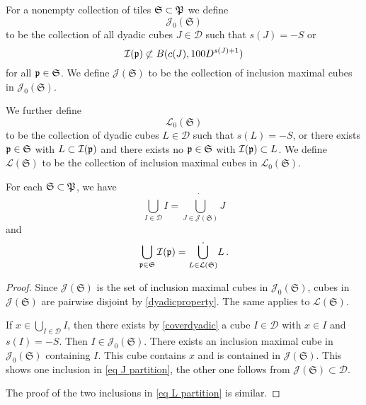 {For a nonempty collection of tiles $\mathfrak{S} \subset \mathfrak P$ we define
$$
    \mathcal{J}_0(\mathfrak{S})
$$
to be the collection of all dyadic cubes $J \in \mathcal{D}$ such that $s(J) = -S$ or
$$
    \mathcal{I}(\mathfrak p) \not\subset B(c(J), 100D^{s(J) + 1})
$$
for all $\mathfrak p \in \mathfrak{S}$. We define $\mathcal{J}(\mathfrak{S})$ to be the collection of inclusion maximal cubes in $\mathcal{J}_0(\mathfrak{S})$.

We further define
$$
    \mathcal{L}_0(\mathfrak{S})
$$
to be the collection of dyadic cubes $L \in \mathcal{D}$ such that $s(L) = -S$, or there exists $\mathfrak p \in \mathfrak{S}$ with $L \subset \mathcal{I}(\mathfrak p)$ and there exists no $\mathfrak p \in \mathfrak{S}$ with $\mathcal{I}(\mathfrak p) \subset L$. We define $\mathcal{L}(\mathfrak{S})$ to be the collection of inclusion maximal cubes in $\mathcal{L}_0(\mathfrak{S})$.

\begin{lemma}
    \label{lem partition}
    For each $\mathfrak{S} \subset \mathfrak P$, we have
    \begin{equation}
        \label{eq J partition}
        \bigcup_{I \in \mathcal{D}} I = \dot{\bigcup_{J \in \mathcal{J}(\mathfrak{S})}} J
    \end{equation}
    and
    \begin{equation}
        \label{eq L partition}
        \bigcup_{\mathfrak p\in \mathfrak{S}} \mathcal{I}(\mathfrak p) = \dot{\bigcup_{L \in \mathcal{L}(\mathfrak{S})}} L\,.
    \end{equation}
\end{lemma}

\begin{proof}
    Since $\mathcal{J}(\mathfrak{S})$ is the set of inclusion maximal cubes in $\mathcal{J}_0(\mathfrak{S})$, cubes in $\mathcal{J}(\mathfrak{S})$ are pairwise disjoint by \eqref{dyadicproperty}. The same applies to $\mathcal{L}(\mathfrak{S})$.

    If $x \in \bigcup_{I \in \mathcal{D}} I$, then there exists by \eqref{coverdyadic} a cube $I \in \mathcal{D}$ with $x \in I$ and $s(I) = -S$. Then $I \in \mathcal{J}_0(\mathfrak{S})$. There exists an inclusion maximal cube in $\mathcal{J}_0(\mathfrak{S})$ containing $I$. This cube contains $x$ and is contained in $\mathcal{J}(\mathfrak{S})$. This shows one inclusion in \eqref{eq J partition}, the other one follows from $\mathcal{J}(\mathfrak{S}) \subset \mathcal{D}$.

    The proof of the two inclusions in \eqref{eq L partition} is similar.
\end{proof}

}
